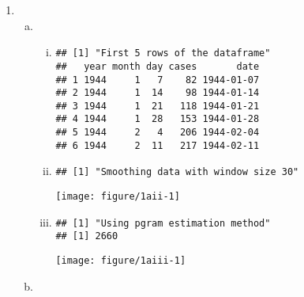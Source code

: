 \documentclass[12pt]{article}\usepackage[]{graphicx}\usepackage[]{color}
\makeatletter
\def\maxwidth{ %
  \ifdim\Gin@nat@width>\linewidth
    \linewidth
  \else
    \Gin@nat@width
  \fi
}
\newenvironment{kframe}{%
 \def\at@end@of@kframe{}%
 \ifinner\ifhmode%
  \def\at@end@of@kframe{\end{minipage}}%
  \begin{minipage}{\columnwidth}%
 \fi\fi%
 \def\FrameCommand##1{\hskip\@totalleftmargin \hskip-\fboxsep
 \colorbox{shadecolor}{##1}\hskip-\fboxsep
     \hskip-\linewidth \hskip-\@totalleftmargin \hskip\columnwidth}%
 \MakeFramed {\advance\hsize-\width
   \@totalleftmargin\z@ \linewidth\hsize
   \@setminipage}}%
 {\par\unskip\endMakeFramed%
 \at@end@of@kframe}
\newenvironment{knitrout}{}{} %
\makeatother
\begin{document}
\begin{enumerate}
    \item %
    \begin{enumerate}[(a)]
        \item \TSa
        \begin{enumerate}[(i)]
            \item

\begin{knitrout}
\color{fgcolor}\begin{kframe}
\begin{verbatim}
## [1] "First 5 rows of the dataframe"
##   year month day cases       date
## 1 1944     1   7    82 1944-01-07
## 2 1944     1  14    98 1944-01-14
## 3 1944     1  21   118 1944-01-21
## 4 1944     1  28   153 1944-01-28
## 5 1944     2   4   206 1944-02-04
## 6 1944     2  11   217 1944-02-11
\end{verbatim}
\end{kframe}
\end{knitrout}

            \item

\begin{knitrout}
\color{fgcolor}\begin{kframe}
\begin{verbatim}
## [1] "Smoothing data with window size 30"
\end{verbatim}
\end{kframe}
\texttt{[image: figure/1aii-1]} 

\end{knitrout}
            \item

\begin{knitrout}
\color{fgcolor}\begin{kframe}
\begin{verbatim}
## [1] "Using pgram estimation method"
## [1] 2660
\end{verbatim}
\end{kframe}
\texttt{[image: figure/1aiii-1]} 

\end{knitrout}


        \end{enumerate}
        \item \TSb


\end{enumerate}
\end{enumerate}
\end{document}
